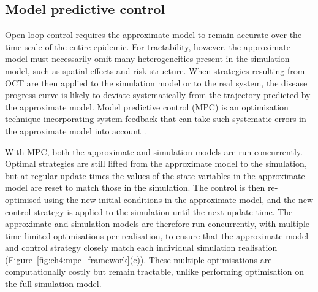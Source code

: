 \subsection{Model predictive control}

Open-loop control requires the approximate model to remain accurate over the time scale of the entire epidemic. For tractability, however, the approximate model must necessarily omit many heterogeneities present in the simulation model, such as spatial effects and risk structure. When strategies resulting from OCT are then applied to the simulation model or to the real system, the disease progress curve is likely to deviate systematically from the trajectory predicted by the approximate model. Model predictive control (MPC) is an optimisation technique incorporating system feedback that can take such systematic errors in the approximate model into account \citep{camacho_model_1995, lee_model_2011}.

With MPC, both the approximate and simulation models are run concurrently. Optimal strategies are still lifted from the approximate model to the simulation, but at regular update times the values of the state variables in the approximate model are reset to match those in the simulation. The control is then re-optimised using the new initial conditions in the approximate model, and the new control strategy is applied to the simulation until the next update time. The approximate and simulation models are therefore run concurrently, with multiple time-limited optimisations per realisation, to ensure that the approximate model and control strategy closely match each individual simulation realisation (Figure~\ref{fig:ch4:mpc_framework}(c)). These multiple optimisations are computationally costly but remain tractable, unlike performing optimisation on the full simulation model.

